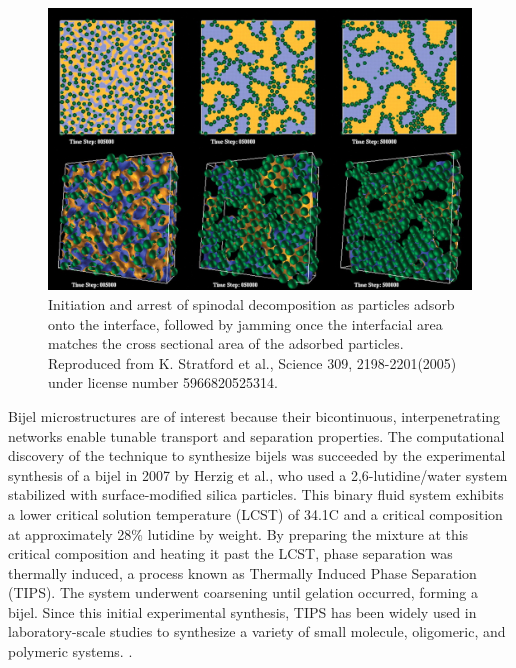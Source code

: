 \begin{figure}
    \centering
    \includegraphics[scale = 0.3]{figures/introduction/bijel_coarsening.jpg}
    \caption{Initiation and arrest of spinodal decomposition as particles adsorb onto the interface, followed by jamming once the 
    interfacial area matches the cross sectional area of the adsorbed particles\cite{stratford_colloidal_2005}. 
    Reproduced from K. Stratford et al., Science 309, 2198-2201(2005) under license number 5966820525314.}
    \label{fig:bijel_coarsen}
\end{figure}

Bijel microstructures are of interest because their bicontinuous, interpenetrating networks enable tunable transport and separation properties. The computational discovery of the technique to 
synthesize bijels was succeeded by the experimental synthesis of a bijel in 2007 by Herzig et al., who used a 2,6-lutidine/water system stabilized with surface-modified silica particles.
\cite{herzig_bicontinuous_2007} 
This binary fluid system exhibits a lower critical solution temperature (LCST) of 34.1\textdegree C and a critical composition at approximately 28\% lutidine by weight. By preparing the mixture at this 
critical composition and heating it past the LCST, phase separation was thermally induced, a process known as Thermally Induced Phase Separation (TIPS). The system underwent coarsening until gelation 
occurred, forming a bijel. Since this initial experimental synthesis, TIPS has been widely used in laboratory-scale studies to synthesize a variety of small molecule, oligomeric, and polymeric systems. 
\cite{tavacoli_novel_2011, lee_bicontinuous_2010, bai_dynamics_2015, ching_rapid_2021}. 

